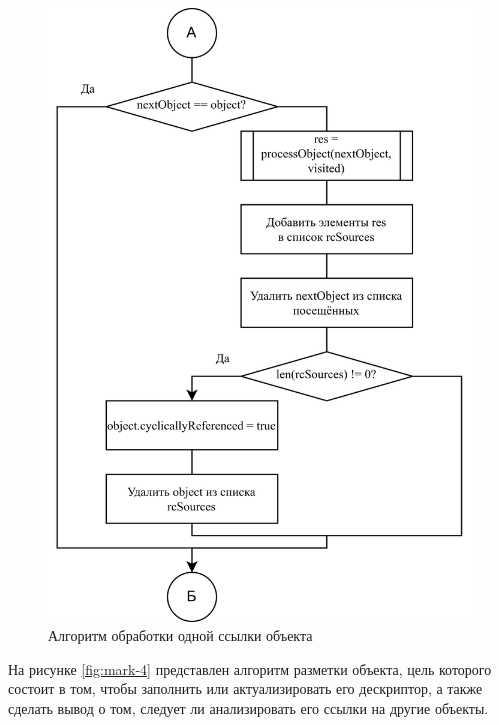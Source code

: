\begin{figure}[H]
	\centering
	\includegraphics[scale=0.185]{assets/mark-3.png}
	\caption{Алгоритм обработки одной ссылки объекта}
	\label{fig:mark-3}
\end{figure}

На рисунке \ref{fig:mark-4} представлен алгоритм разметки объекта, цель которого состоит в том, чтобы заполнить или актуализировать его дескриптор, а также сделать вывод о том, следует ли анализировать его ссылки на другие объекты.

